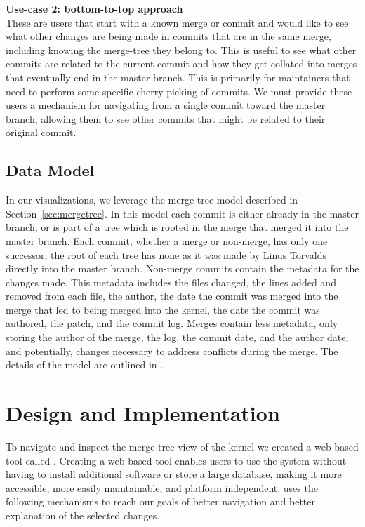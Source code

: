 \documentclass[draft]{IEEEtran}
\begin{document}
\noindent \textbf{Use-case 2: bottom-to-top
  approach}\label{sec:usecase2}\\ These are users that start with a
known merge or commit and would like to see what other changes are being
made in commits that are in the same merge, including knowing the
merge-tree they belong to. This is useful to see what other commits are
related to the current commit and how they get collated into merges that
eventually end in the master branch. This is primarily for maintainers
that need to perform some specific cherry picking of commits. We must
provide these users a mechanism for navigating from a single commit
toward the master branch, allowing them to see other commits that might
be related to their original commit.

\subsection{Data Model}

In our visualizations, we leverage the merge-tree model described in
Section~\ref{sec:mergetree}. In this model each commit is either already
in the master branch, or is part of a tree which is rooted in the merge
that merged it into the master branch.  Each commit, whether a merge or
non-merge, has only one successor; the root of each tree has none as it
was made by Linus Torvalds directly into the master branch. Non-merge
commits contain the metadata for the changes made.  This metadata
includes the files changed, the lines added and removed from each file,
the author, the date the commit was merged into the merge that led to
being merged into the kernel, the date the commit was authored, the
patch, and the commit log. Merges contain less metadata, only storing
the author of the merge, the log, the commit date, and the author date,
and potentially, changes necessary to address conflicts during the
merge. The details of the model are outlined in \cite{German2015}.

\section{Design and Implementation}

To navigate and inspect the merge-tree view of the kernel we created a
web-based tool called \tool. Creating a web-based tool enables users to
use the system without having to install additional software or store a
large database, making it more accessible, more easily maintainable, and
platform independent. \tool uses the following mechanisms to reach our
goals of better navigation and better explanation of the selected
changes.
\end{document}
